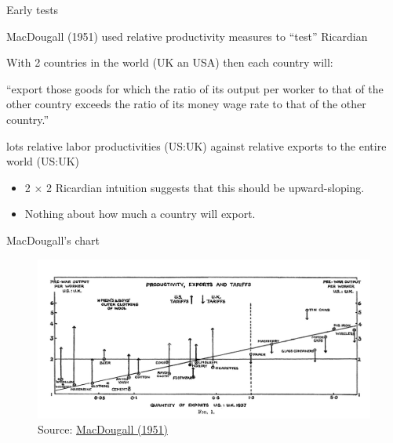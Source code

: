 \documentclass[notes,11pt, aspectratio=169, xcolor=table]{beamer}
\newenvironment{wideitemize}{\itemize\addtolength{\itemsep}{10pt}}{\enditemize}
\begin{document}
\begin{frame}{Early tests}
    \begin{wideitemize}
        \item MacDougall (1951) used relative productivity measures to ``test'' Ricardian

        \item<2-> With 2 countries in the world (UK an USA) then each country will:

        \begin{blockquote}
            “export those goods for which the ratio of its output per worker to that of the other country exceeds the ratio of its money wage rate to that of the other country.”
        \end{blockquote}

        \item<3-> lots relative labor productivities (US:UK) against relative exports to the entire world (US:UK)

        \begin{itemize}
            \item 2 × 2 Ricardian intuition suggests that this should be upward-sloping.
            \item Nothing about how much a country will export. 
        \end{itemize}
        
    \end{wideitemize}
\end{frame}

\begin{frame}{MacDougall's chart}
    \begin{figure}
        \centering
        \includegraphics[width=0.9\linewidth]{figs/MacDougall1.jpg}
        \caption{Source: \href{https://www.jstor.org/stable/pdf/2226976.pdf}{MacDougall (1951)} }
        \label{fig:macdouall}
    \end{figure}
\end{frame}
\end{document}
